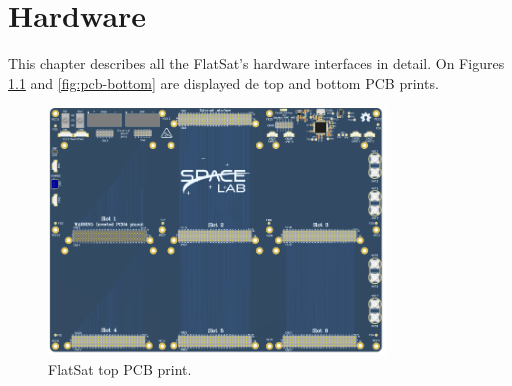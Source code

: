 %
%
%
%
%

%
%
%
%
%
%

\chapter{Hardware} \label{ch:hardware}

This chapter describes all the FlatSat's hardware interfaces in detail. On Figures \ref{fig:pcb-top} and \ref{fig:pcb-bottom} are displayed de top and bottom PCB prints.

\begin{figure}[!ht]
    \begin{center}
        \includegraphics[width=0.8\textwidth]{figures/flatsat_top_image.png}
        \caption{FlatSat top PCB print.}
        \label{fig:pcb-top}
    \end{center}
\end{figure}

